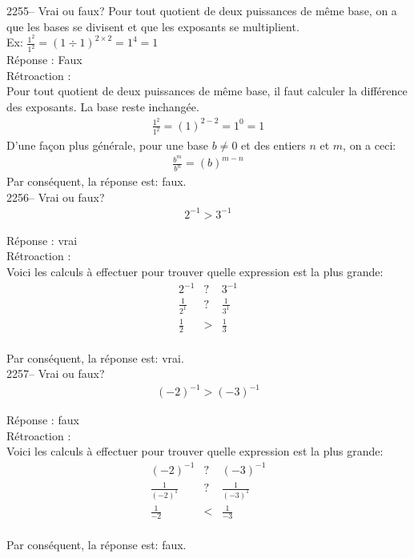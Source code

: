 \documentclass[letterpaper, 12pt]{article}
\begin{document}
2255-- Vrai ou faux? Pour tout quotient de deux puissances de m\^eme base, on a que les bases se divisent et que les exposants se multiplient.\\

Ex: $\frac{1^{2}}{1^{2}}=(1\div 1)^{2\times 2}=1^{4}=1$\\

R\'eponse : Faux\\

R\'etroaction :\\
Pour tout quotient de deux puissances de m\^eme base, il faut
calculer la diff\'erence des exposants. La base reste inchang\'ee.
\begin{eqnarray*}
\frac{1^{2}}{1^{2}}=(1)^{2-2}=1^{0}=1
\end{eqnarray*}
D'une fa\c con plus g\'en\'erale, pour une base $b\neq0$ et des
entiers $n$ et $m$,  on a ceci:
\begin{eqnarray*}
\frac{b^{m}}{b^{n}}=(b)^{m-n}
\end{eqnarray*}
Par cons\'equent, la r\'eponse est: faux.\\

2256-- Vrai ou faux?
\begin{eqnarray*}
2^{-1}>3^{-1}
\end{eqnarray*}

R\'eponse : vrai\\

R\'etroaction :\\
Voici les calculs \`a effectuer pour trouver quelle expression est la plus grande:
\begin{eqnarray*}
2^{-1}&?&3^{-1}\\[2mm]
\frac{1}{2^{1}}&?&\frac{1}{3^{1}}\\[2mm]
\frac{1}{2}&> &\frac{1}{3}
\end{eqnarray*}\\
Par cons\'equent, la r\'eponse est: vrai.\\

2257-- Vrai ou faux?
\begin{eqnarray*}
(-2)^{-1}>(-3)^{-1}
\end{eqnarray*}

R\'eponse : faux\\

R\'etroaction :\\
Voici les calculs \`a effectuer pour trouver quelle expression est la plus grande:
\begin{eqnarray*}
(-2)^{-1}&?&(-3)^{-1}\\[2mm]
\frac{1}{(-2)^{1}}&?&\frac{1}{(-3)^{1}}\\[2mm]
\frac{1}{-2}& < &\frac{1}{-3}
\end{eqnarray*}\\
Par cons\'equent, la r\'eponse est: faux.\\
\end{document}
